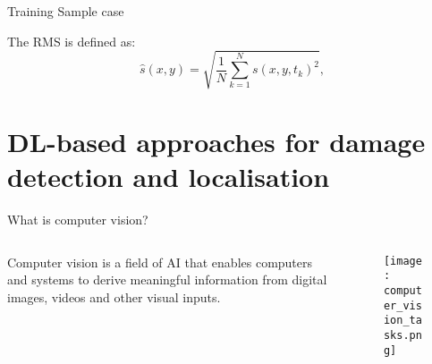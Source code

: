 \documentclass[10pt,aspectratio=169,dvipsnames]{beamer} %
\begin{document}
\setcounter{subfigure}{0}
\begin{frame}{Training Sample case}
	\begin{figure}
		\centering
		\qquad
		\qquad
	\end{figure}

The RMS is defined as:
\begin{equation}
	\hat{s}(x,y) = \sqrt{\frac{1}{N}\sum_{k=1}^{N}s(x,y,t_k)^2}, 
	\label{eqn:rms} 
\end{equation}
\end{frame}
\section{DL-based approaches for damage detection and localisation}
\setcounter{subfigure}{0}
\begin{frame}{What is computer vision?}
	\begin{columns}[T]
		\begin{column}[c]{0.30\textwidth}
			Computer vision is a field of AI that enables computers and systems to derive meaningful information from digital images, videos and other visual inputs. 
		\end{column}
		\hfill
		\begin{column}[c]{0.65\textwidth}
			\begin{figure}
				\centering
				\texttt{[image: computer\_vision\_tasks.png]}
			\end{figure}
		\end{column}
	\end{columns}	
\end{frame}
\end{document}

